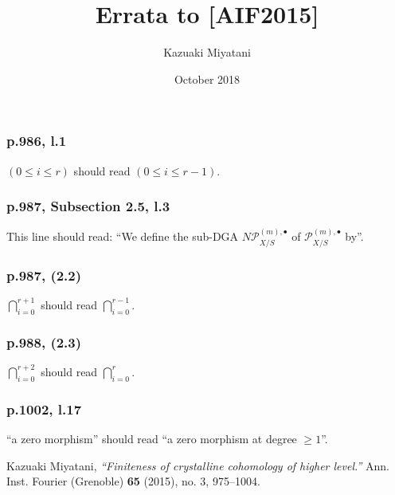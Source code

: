 \documentclass{article}
\title{Errata to [AIF2015]}
\author{Kazuaki Miyatani}
\date{October 2018}
\begin{document}
\maketitle

\subsubsection*{p.986, l.1}
$(0\leq i\leq r)$ should read $(0\leq i\leq r-1)$.

\subsubsection*{p.987, Subsection 2.5, l.3}
This line should read: ``We define the sub-DGA $N\mathscr{P}^{(m),\bullet}_{X/S}$ of $\mathscr{P}^{(m),\bullet}_{X/S}$ by''.

\subsubsection*{p.987, (2.2)}
$\bigcap_{i=0}^{r+1}$ should read $\bigcap_{i=0}^{r-1}$.

\subsubsection*{p.988, (2.3)}
$\bigcap_{i=0}^{r+2}$ should read $\bigcap_{i=0}^{r}$.
    
\subsubsection*{p.1002, l.17}
``a zero morphism'' should read ``a zero morphism at degree $\geq 1$''.

\begin{thebibliography}{99}
Kazuaki Miyatani,
\emph{``Finiteness of crystalline cohomology of higher level.''}
Ann. Inst. Fourier (Grenoble) \textbf{65} (2015), no. 3, 975--1004. 
\end{thebibliography}
\end{document}
